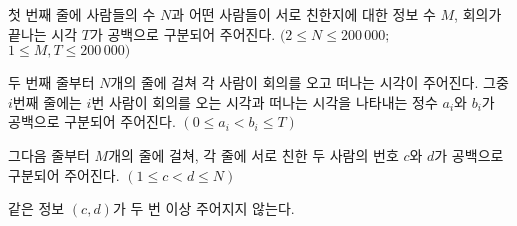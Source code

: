첫 번째 줄에 사람들의 수 $N$과 어떤 사람들이 서로 친한지에 대한 정보 수 $M$, 회의가 끝나는 시각 $T$가 공백으로 구분되어 주어진다. $(2 \le N \le 200\,000;$ $1 \le M, T \le 200\,000)$

두 번째 줄부터 $N$개의 줄에 걸쳐 각 사람이 회의를 오고 떠나는 시각이 주어진다. 그중 $i$번째 줄에는 $i$번 사람이 회의를 오는 시각과 떠나는 시각을 나타내는 정수 $a_i$와 $b_i$가 공백으로 구분되어 주어진다. $(0 \le a_i \lt b_i \le T)$

그다음 줄부터 $M$개의 줄에 걸쳐, 각 줄에 서로 친한 두 사람의 번호 $c$와 $d$가 공백으로 구분되어 주어진다. $(1 \le c \lt d \le N)$

같은 정보 $(c, d)$가 두 번 이상 주어지지 않는다.
